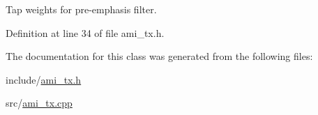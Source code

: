 Tap weights for pre-\/emphasis filter. 



Definition at line 34 of file ami\+\_\+tx.\+h.



The documentation for this class was generated from the following files\+:\begin{DoxyCompactItemize}
\item 
include/\hyperlink{ami__tx_8h}{ami\+\_\+tx.\+h}\item 
src/\hyperlink{ami__tx_8cpp}{ami\+\_\+tx.\+cpp}\end{DoxyCompactItemize}
